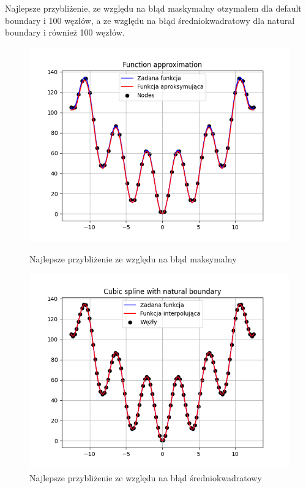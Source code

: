 \documentclass{article}
\begin{document}
Najlepsze przybliżenie, ze względu na błąd maskymalny otzymałem dla default boundary i 100 węzłów, a ze względu na błąd średniokwadratowy dla natural boundary i również 100 węzłów.

\begin{figure}[H]
  \begin{minipage}[b]{0.49\textwidth}
    \includegraphics[width=\textwidth]{img30.png}
    \caption{Najlepsze przybliżenie ze względu na błąd maksymalny}
  \end{minipage}
  \hfill
  \begin{minipage}[b]{0.49\textwidth}
    \includegraphics[width=\textwidth]{img33.png}
    \caption{Najlepsze przybliżenie ze względu na błąd średniokwadratowy}
  \end{minipage}
\end{figure}
\end{document}
